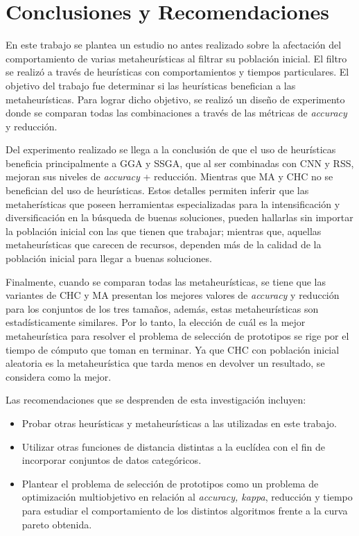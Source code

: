\chapter*{Conclusiones y Recomendaciones}
\label{conclusiones}

En este trabajo se plantea un estudio no antes realizado sobre la afectación del comportamiento de varias metaheurísticas al filtrar su población inicial. El filtro se realizó a través de heurísticas con comportamientos y tiempos particulares. El objetivo del trabajo fue determinar si las heurísticas benefician a las metaheurísticas. Para lograr dicho objetivo, se realizó un diseño de experimento donde se comparan todas las combinaciones a través de las métricas de \emph{accuracy} y reducción.

Del experimento realizado se llega a la conclusión de que el uso de heurísticas beneficia principalmente a GGA y SSGA, que al ser combinadas con CNN y RSS, mejoran sus niveles de \emph{accuracy} + reducción. Mientras que MA y CHC no se benefician del uso de heurísticas. Estos detalles permiten inferir que las metaherísticas que poseen herramientas especializadas para la intensificación y diversificación en la búsqueda de buenas soluciones, pueden hallarlas sin importar la población inicial con las que tienen que trabajar; mientras que, aquellas metaheurísticas que carecen de recursos, dependen más de la calidad de la población inicial para llegar a buenas soluciones.

Finalmente, cuando se comparan todas las metaheurísticas, se tiene que las variantes de CHC y MA presentan los mejores valores de \emph{accuracy} y reducción para los conjuntos de los tres tamaños, además, estas metaheurísticas son estadísticamente similares. Por lo tanto, la elección de cuál es la mejor metaheurística para resolver el problema de selección de prototipos se rige por el tiempo de cómputo que toman en terminar. Ya que CHC con población inicial aleatoria es la metaheurística que tarda menos en devolver un resultado, se considera como la mejor. 

Las recomendaciones que se desprenden de esta investigación incluyen: 

\begin{itemize}

\item Probar otras heurísticas y metaheurísticas a las utilizadas en este trabajo.

\item Utilizar otras funciones de distancia distintas a la euclídea con el fin de incorporar conjuntos de datos categóricos.

\item Plantear el problema de selección de prototipos como un problema de optimización multiobjetivo en relación al \emph{accuracy, kappa}, reducción y tiempo para estudiar el comportamiento de los distintos algoritmos frente a la curva pareto obtenida.

\end{itemize}

